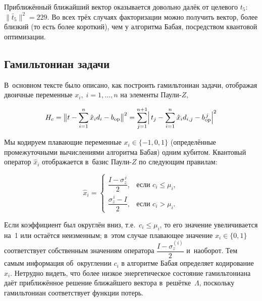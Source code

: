 Приближённый ближайший вектор оказывается довольно далёк от целевого \(t_{5}\):
\(\lVert\bar t_{5}\rVert^{2}=229\). Во всех трёх случаях факторизации можно
получить вектор, более близкий (то есть более короткий), чем у алгоритма Бабая,
посредством квантовой оптимизации.

\subsection*{Гамильтониан задачи}

В основном тексте было описано, как построить гамильтониан задачи, отображая
двоичные переменные $x_i,\; i = 1,\dots,n$ на элементы Паули‑$Z$,

\begin{equation}
H_{c}
  = \bigl\lVert t - \sum_{i=1}^{n} \hat x_{i} d_{i} - b_{\mathrm{op}}\bigr\rVert^{2}
  = \sum_{j=1}^{n+1} \Bigl|\, t_{j} - \sum_{i=1}^{n} \hat x_{i} d_{i,j}
           - b^{\,j}_{\mathrm{op}} \Bigr|^{2}
\end{equation}

Мы кодируем плавающие переменные $x_i\in\{-1,0,1\}$ (определённые
промежуточными вычислениями алгоритма Бабая) одним кубитом. Квантовый оператор
$\hat x_i$ отображается в базис Паули‑$Z$ по следующим правилам:

\begin{equation}
\hat x_{i} =
\begin{cases}
\dfrac{I - \sigma^{\,i}_{z}}{2}, & \text{если } c_{i} \le \mu_{i},\\[6pt]
\dfrac{\sigma^{\,i}_{z} - I}{2}, & \text{если } c_{i} > \mu_{i}.
\end{cases}
\end{equation}

Если коэффициент был округлён вниз, т.е.\ $c_i\le\mu_i$, то его значение
увеличивается на 1 или остаётся неизменным; в этом случае плавающее значение
$x_i\in\{0,1\}$ соответствует собственным значениям оператора
$\dfrac{I-\sigma_z^{(i)}}{2}$ и наоборот. Тем самым информация об округлении
$c_i$ в алгоритме Бабая определяет кодирование $x_i$. Нетрудно видеть, что
более низкое энергетическое состояние гамильтониана даёт приближённое решение
ближайшего вектора в решётке $\Lambda$, поскольку гамильтониан соответствует
функции потерь.

